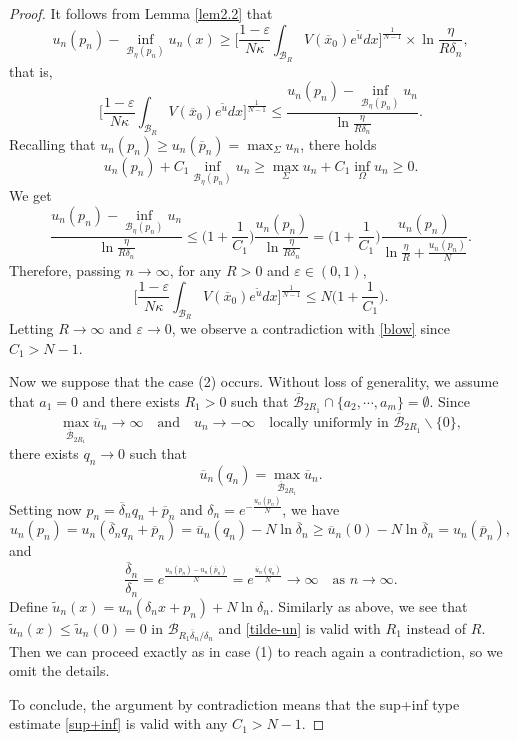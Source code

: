\documentclass[11pt]{amsart}
\numberwithin{equation}{section}
\begin{document}
\begin{proof}
It follows from Lemma \ref{lem2.2} that
$$u_{n}(p_n)-\inf_{\mathcal{B}_{\eta}(p_n)}u_{n}(x)\geq \Big[\frac{1-\varepsilon}{N\kappa}\int_{\mathcal{B}_{R}}V(\overline{x}_{0})e^{\widetilde{u}}dx\Big]^{\frac{1}{N-1}}\times\ln\frac{\eta}{R\delta_{n}},$$
that is,
$$\Big[\frac{1-\varepsilon}{N\kappa}\int_{\mathcal{B}_{R}}V(\overline{x}_{0})e^{\widetilde{u}}dx\Big]^{\frac{1}{N-1}}\leq \frac{u_{n}(p_n)-\inf_{\mathcal{B}_{\eta}(p_n)}u_{n}}{\ln\frac{\eta}{R\delta_{n}}}.$$
Recalling that $u_n(p_n) \geq u_n(\overline p_n) = \max_\Sigma u_n$, there holds
$$u_{n}(p_n) + C_1\inf_{\mathcal{B}_{\eta}(p_n)}u_n  \geq \max_\Sigma u_n + C_1\inf_{\Omega}u_{n} \geq 0.$$
We get
$$ \frac{u_{n}(p_n)-\inf_{\mathcal{B}_{\eta}(p_n)}u_{n}}{\ln\frac{\eta}{R\delta_{n}}} \leq \Big(1+\frac{1}{C_{1}}\Big)\frac{u_{n}(p_n)}{\ln\frac{\eta}{R\delta_{n}}} = \Big(1+\frac{1}{C_{1}}\Big)\frac{u_{n}(p_n)}{\ln\frac{\eta}{R} + \frac{u_{n}(p_n)}{N}}.
$$
Therefore, passing $n \to \infty$, for any $R>0$ and $\varepsilon \in (0, 1)$,
$$\Big[\frac{1-\varepsilon}{N\kappa}\int_{\mathcal{B}_{R}}V(\overline{x}_{0})e^{\widetilde{u}}dx\Big]^{\frac{1}{N-1}}\leq N\Big(1+\frac{1}{C_{1}}\Big).$$
Letting $R\rightarrow\infty$ and $\varepsilon\rightarrow 0$, we observe a contradiction with \eqref{blow} since $C_1>N-1$.

\medskip
Now we suppose that the case (2) occurs. Without loss of generality, we assume that $a_{1}=0$ and there exists $R_{1}>0$ such that $\overline{\mathcal{B}}_{2R_{1}}\cap\{a_{2},\cdots,a_m\}=\emptyset$. Since
$$\max_{\overline{\mathcal{B}}_{2R_{1}}}\overline{u}_{n}\rightarrow\infty \quad \mbox{and}\quad u_{n}\rightarrow-\infty \quad\mbox{locally uniformly in } \overline{\mathcal{B}}_{2R_{1}}\backslash\{0\},$$
there exists $q_{n}\rightarrow0$ such that
$$\overline{u}_{n}(q_{n})=\max_{\overline{\mathcal{B}}_{2R_{1}}}\overline{u}_{n}.$$
Setting now $p_n=\overline{\delta}_{n}q_{n}+\overline{p}_{n}$ and $\delta_{n}=e^{-\frac{u_{n}(p_n)}{N}}$, we have
$$u_{n}(p_n)=u_{n}(\overline{\delta}_{n}q_{n}+\overline{p}_{n})=\overline{u}_{n}(q_{n})-N\ln\overline{\delta}_{n}\geq \overline{u}_{n}(0) -N\ln\overline{\delta}_{n}=u_{n}(\overline{p}_{n}),$$
and
$$\frac{\overline{\delta}_{n}}{\delta_{n}}=e^{\frac{u_{n}(p_n)-u_{n}(\overline{p}_{n})}{N}}=e^{\frac{\overline{u}_{n}(q_{n})}{N}}\rightarrow\infty \quad\mbox{as }n\rightarrow\infty.$$
Define $\widetilde{u}_{n}(x)=u_{n}(\delta_{n}x+p_n)+N\ln\delta_{n}$. Similarly as above, we see that $\widetilde{u}_{n}(x)\leq \widetilde{u}_{n}(0) =0$ in $ \mathcal{B}_{R_1\overline{\delta}_{n}/\delta_{n}}$ and \eqref{tilde-un} is valid with $R_1$ instead of $R$. Then we can proceed exactly as in case (1) to reach again a contradiction, so we omit the details.

\medskip
To conclude, the argument by contradiction means that the sup+inf type estimate \eqref{sup+inf} is valid with any $C_1 > N-1$.
\end{proof}
\end{document}
